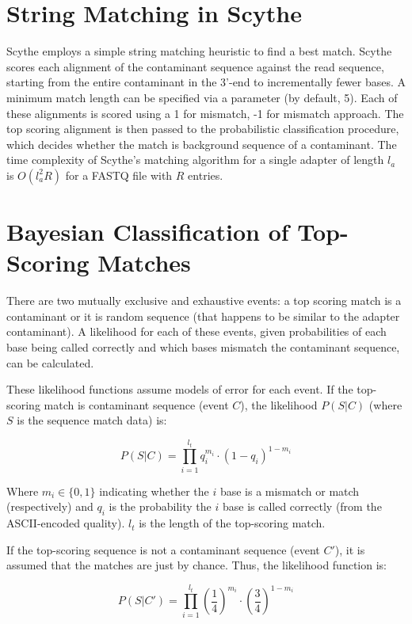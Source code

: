 \documentclass{bioinfo}
\begin{document}
\begin{methods}
\section{String Matching in Scythe}

Scythe employs a simple string matching heuristic to find a best
match. Scythe scores each alignment of the contaminant sequence
against the read sequence, starting from the entire contaminant in the
3'-end to incrementally fewer bases. A minimum match length can be
specified via a parameter (by default, 5). Each of these alignments is
scored using a 1 for mismatch, -1 for mismatch approach. The top
scoring alignment is then passed to the probabilistic classification
procedure, which decides whether the match is background sequence of a
contaminant. The time complexity of Scythe's matching algorithm for a
single adapter of length $l_a$ is $O(l_a^2 R)$ for a FASTQ file with
$R$ entries.


\section{Bayesian Classification of Top-Scoring Matches}

There are two mutually exclusive and exhaustive events: a top scoring
match is a contaminant or it is random sequence (that happens to be
similar to the adapter contaminant). A likelihood for each of these
events, given probabilities of each base being called correctly and
which bases mismatch the contaminant sequence, can be calculated.

These likelihood functions assume models of error for each event. If
the top-scoring match is contaminant sequence (event $C$), the
likelihood $P(S | C)$ (where $S$ is the sequence match data) is:

$$ P(S | C) = \prod_{i=1}^{l_t} q_i^{m_i} \cdot (1-q_i)^{1 - m_i} $$

Where $m_i \in \{0, 1\}$ indicating whether the $i$ base is a mismatch
or match (respectively) and $q_i$ is the probability the $i$ base is
called correctly (from the ASCII-encoded quality). $l_t$ is the length
of the top-scoring match.

If the top-scoring sequence is not a contaminant sequence (event
$C'$), it is assumed that the matches are just by chance. Thus, the
likelihood function is:

$$ P(S | C') = \prod_{i=1}^{l_t} \left(\frac{1}{4}\right)^{m_i} \cdot \left(\frac{3}{4}\right)^{1 - m_i} $$


\end{methods}
\end{document}
